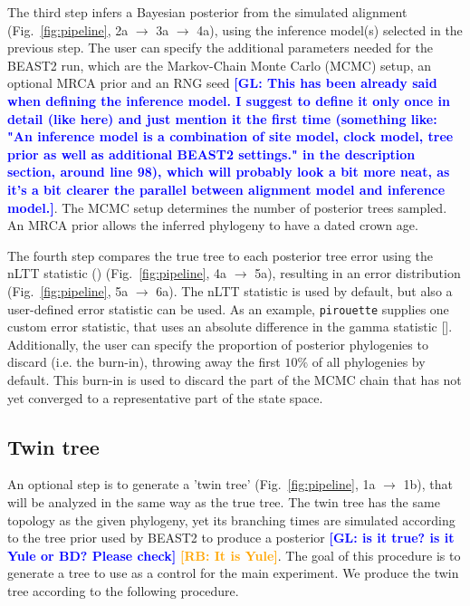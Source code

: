 \documentclass{article}
\newcommand{\giovanni}[1]{\textcolor{blue}{\textbf{[GL: #1]}}}
\newcommand{\richel}[1]{\textcolor{orange}{\textbf{[RB: #1]}}}
\begin{document}
The third step infers a Bayesian posterior from the simulated 
alignment (Fig.~\ref{fig:pipeline}, 2a $\rightarrow$ 3a $\rightarrow$ 4a),
using the inference model(s) selected in the previous step. The user
can specify the additional parameters needed for the BEAST2 run, which
are the Markov-Chain Monte Carlo (MCMC) setup, 
an optional MRCA prior and an RNG seed \giovanni{This has been already said when defining the inference model. I suggest to define it only once in detail (like here) and just mention it the first time (something like: "An inference model is a combination of site model, clock model, tree prior as well as additional BEAST2 settings." in the description section, around line 98), which will probably look a bit more neat, as it's a bit clearer the parallel between alignment model and inference model.}.
The MCMC setup determines the number of posterior trees sampled.
An MRCA prior allows the inferred phylogeny to have a dated crown age.

The fourth step compares the true tree to each posterior tree
error using the nLTT statistic (\cite{janzen2015approximate}) 
(Fig.~\ref{fig:pipeline}, 4a $\rightarrow$ 5a), resulting
in an error distribution (Fig.~\ref{fig:pipeline}, 5a $\rightarrow$ 6a).
The nLTT statistic is used by default, but also a user-defined error statistic can be used. As an example,
\verb;pirouette; supplies one custom error statistic,
that uses an absolute difference in the gamma statistic [\cite{pybus2000testing}].
Additionally, the user can specify the
proportion of posterior phylogenies to 
discard (i.e. the burn-in), throwing away the first $10\%$
of all phylogenies by default. This burn-in is used to discard
the part of the MCMC chain that has not yet converged to a
representative part of the state space.

\subsection{Twin tree}

An optional step is to generate a 'twin tree' (Fig.~\ref{fig:pipeline}, 1a $\rightarrow$ 1b),
that will be analyzed in the same way as the true tree.
The twin tree has the same topology as the given phylogeny, 
yet its branching times are simulated according to 
the tree prior used by BEAST2 to produce a posterior 
\giovanni{is it true? is it Yule or BD? Please check}
\richel{It is Yule}.
The goal of this procedure is to generate a tree 
to use as a control for the main experiment.
We produce the twin tree according to the following procedure.
\end{document}
